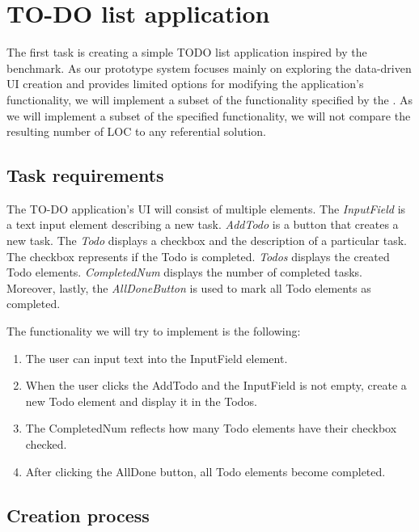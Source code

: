 \section{TO-DO list application}
The first task is creating a simple TODO list application inspired by the \citet{TodoMVC} benchmark.
As our prototype system focuses mainly on exploring the data-driven UI creation and provides limited options for modifying the application's functionality,
we will implement a subset of the functionality specified by the \citet{todo-spec}.
As we will implement a subset of the specified functionality, we will not compare the resulting number of LOC to any referential solution.

\subsection{Task requirements}

The TO-DO application's UI will consist of multiple elements.
The \emph{InputField} is a text input element describing a new task.
\emph{AddTodo} is a button that creates a new task.
The \emph{Todo} displays a checkbox and the description of a particular task. The checkbox represents if the Todo is completed.
\emph{Todos} displays the created Todo elements.
\emph{CompletedNum} displays the number of completed tasks.
Moreover, lastly, the \emph{AllDoneButton} is used to mark all Todo elements as completed.

The functionality we will try to implement is the following:
\begin{enumerate}
	\item The user can input text into the InputField element.
	\item When the user clicks the AddTodo and the InputField is not empty, create a new Todo element and display it in the Todos.
	\item The CompletedNum reflects how many Todo elements have their checkbox checked.
	\item After clicking the AllDone button, all Todo elements become completed.
\end{enumerate}
\medskip
\subsection{Creation process}

